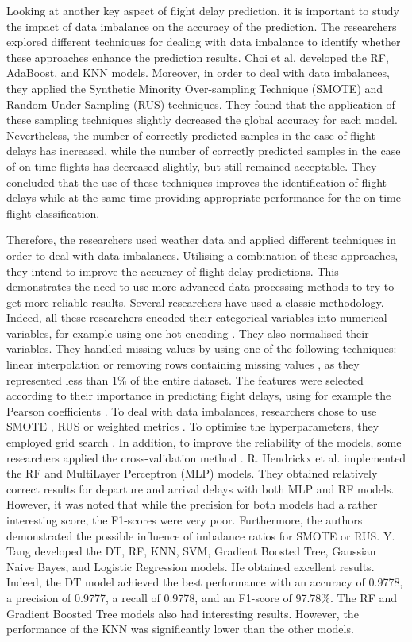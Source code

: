 \documentclass[12pt,oneside]{book} %
\begin{document}
\noindent Looking at another key aspect of flight delay prediction, it is important to study the impact of data imbalance on the accuracy of the prediction. The researchers explored different techniques for dealing with data imbalance to identify whether these approaches enhance the prediction results. Choi et al. \cite{choi} developed the RF, AdaBoost, and KNN models. Moreover, in order to deal with data imbalances, they applied the Synthetic Minority Over-sampling Technique (SMOTE) and Random Under-Sampling (RUS) techniques. They found that the application of these sampling techniques slightly decreased the global accuracy for each model. Nevertheless, the number of correctly predicted samples in the case of flight delays has increased, while the number of correctly predicted samples in the case of on-time flights has decreased slightly, but still remained acceptable. They concluded that the use of these techniques improves the identification of flight delays while at the same time providing appropriate performance for the on-time flight classification.

\noindent Therefore, the researchers used weather data and applied different techniques in order to deal with data imbalances. Utilising a combination of these approaches, they intend to improve the accuracy of flight delay predictions. This demonstrates the need to use more advanced data processing methods to try to get more reliable results. Several researchers have used a classic methodology. Indeed, all these researchers encoded their categorical variables into numerical variables, for example using one-hot encoding \cite{kim}. They also normalised their variables. They handled missing values by using one of the following techniques: linear interpolation \citep{choi} or removing rows containing missing values \cite{Tang}, as they represented less than 1\% of the entire dataset. The features were selected according to their importance in predicting flight delays, using for example the Pearson coefficients \cite{hendrickx}. To deal with data imbalances, researchers chose to use SMOTE \citep{hendrickx,choi}, RUS \cite{kim,choi} or weighted metrics \cite{Tang}. To optimise the hyperparameters, they employed grid search \citep{hendrickx,kim}. In addition, to improve the reliability of the models, some researchers applied the cross-validation method \citep{hendrickx,choi}. R. Hendrickx et al. \cite{hendrickx} implemented the RF and MultiLayer Perceptron (MLP) models. They obtained relatively correct results for departure and arrival delays with both MLP and RF models. However, it was noted that while the precision for both models had a rather interesting score, the F1-scores were very poor. Furthermore, the authors demonstrated the possible influence of imbalance ratios for SMOTE or RUS.  Y. Tang \cite{Tang} developed the DT, RF, KNN, SVM, Gradient Boosted Tree, Gaussian Naive Bayes, and Logistic Regression models. He obtained excellent results. Indeed, the DT model achieved the best performance with an accuracy of 0.9778, a precision of 0.9777, a recall of 0.9778, and an F1-score of 97.78\%. The RF and Gradient Boosted Tree models also had interesting results. However, the performance of the KNN was significantly lower than the other models.
\end{document}
